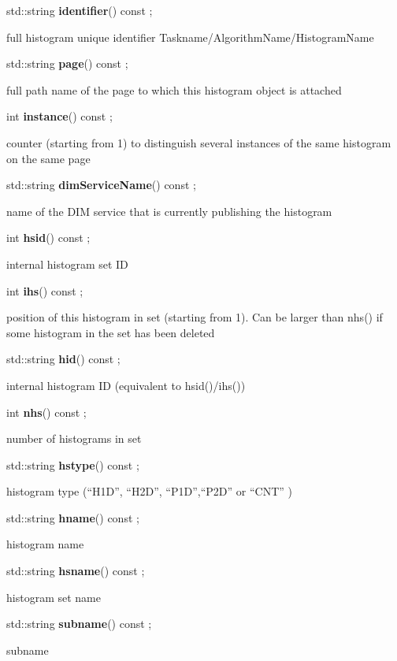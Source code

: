 \item    std::string {\bf identifier}() const ;

 full histogram unique identifier Taskname/AlgorithmName/HistogramName


\item    std::string {\bf page}() const ;

 full path name of the page to which this histogram object is attached


\item    int {\bf instance}() const ;

 counter (starting from 1) to distinguish several instances of the same histogram on the same page


\item    std::string {\bf dimServiceName}() const  ;

 name of the DIM service that is currently publishing the histogram


\item    int {\bf hsid}() const ;

 internal histogram set ID


\item    int {\bf ihs}() const ;

 position of this histogram in set (starting from 1). Can be larger than nhs() if some histogram in the set has been deleted


\item    std::string {\bf hid}() const ;

 internal histogram ID (equivalent to hsid()/ihs())


\item    int {\bf nhs}() const ;

 number of histograms in set


\item    std::string {\bf hstype}() const ;

 histogram type (``H1D'', ``H2D'', ``P1D'',``P2D'' or ``CNT'' )


\item    std::string {\bf hname}() const ;

 histogram name


\item    std::string {\bf hsname}() const ;

 histogram set name


\item    std::string {\bf subname}() const ;

 subname


